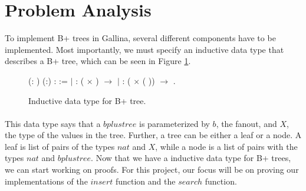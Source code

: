 \section{Problem Analysis}
\label{sec:ProblemAnalysis}
To implement B+ trees in Gallina, several different components have to be implemented. Most importantly, we must specify an inductive data type that describes a B+ tree, which can be seen in Figure \ref{fig:inductive_data_type}.

\begin{figure}
\centering
\begin{coqdoccode}
  (: ) (:) :  :=\coqdoceol
\coqdocindent{1.00em}
\ensuremath{|}  :  ( \ensuremath{\times} ) \ensuremath{\rightarrow}   \coqdoceol
\coqdocindent{1.00em}
\ensuremath{|}  :  ( \ensuremath{\times} (  )) \ensuremath{\rightarrow}   .\coqdoceol
\end{coqdoccode}
\caption{Inductive data type for B+ tree.}
\label{fig:inductive_data_type}
\end{figure}

\paragraph{}
This data type says that a $bplustree$ is parameterized by $b$, the fanout, and $X$, the type of the values in the tree. Further, a tree can be either a leaf or a node. A leaf is list of pairs of the types $nat$ and $X$, while a node is a list of pairs with the types $nat$ and $bplustree$. Now that we have a inductive data type for B+ trees, we can start working on proofs. For this project, our focus will be on proving our implementations of the $insert$ function and the $search$ function.

\paragraph{}

